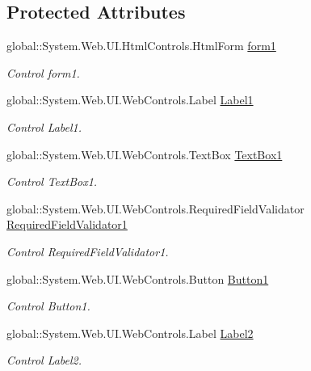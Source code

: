 \subsection*{Protected Attributes}
\begin{DoxyCompactItemize}
\item 
global\+::\+System.\+Web.\+U\+I.\+Html\+Controls.\+Html\+Form \mbox{\hyperlink{class_inicio_1_1_cambiar_password_a14ad331c75f392329019b277a2d2c8d9}{form1}}
\begin{DoxyCompactList}\small\item\em Control form1. \end{DoxyCompactList}\item 
global\+::\+System.\+Web.\+U\+I.\+Web\+Controls.\+Label \mbox{\hyperlink{class_inicio_1_1_cambiar_password_ac4c5034d33d8290117987f9fc981e247}{Label1}}
\begin{DoxyCompactList}\small\item\em Control Label1. \end{DoxyCompactList}\item 
global\+::\+System.\+Web.\+U\+I.\+Web\+Controls.\+Text\+Box \mbox{\hyperlink{class_inicio_1_1_cambiar_password_ab827a758058e29a7846579183e4cbcea}{Text\+Box1}}
\begin{DoxyCompactList}\small\item\em Control Text\+Box1. \end{DoxyCompactList}\item 
global\+::\+System.\+Web.\+U\+I.\+Web\+Controls.\+Required\+Field\+Validator \mbox{\hyperlink{class_inicio_1_1_cambiar_password_a97691c6df6a8a92e71fe388ec90bd635}{Required\+Field\+Validator1}}
\begin{DoxyCompactList}\small\item\em Control Required\+Field\+Validator1. \end{DoxyCompactList}\item 
global\+::\+System.\+Web.\+U\+I.\+Web\+Controls.\+Button \mbox{\hyperlink{class_inicio_1_1_cambiar_password_a1fb3744d75ceb088b1368122d0007cee}{Button1}}
\begin{DoxyCompactList}\small\item\em Control Button1. \end{DoxyCompactList}\item 
global\+::\+System.\+Web.\+U\+I.\+Web\+Controls.\+Label \mbox{\hyperlink{class_inicio_1_1_cambiar_password_ab4a6fd8e13543ff98bc786be8a2b3a1c}{Label2}}
\begin{DoxyCompactList}\small\item\em Control Label2. \end{DoxyCompactList}\item 

\end{DoxyCompactItemize}
